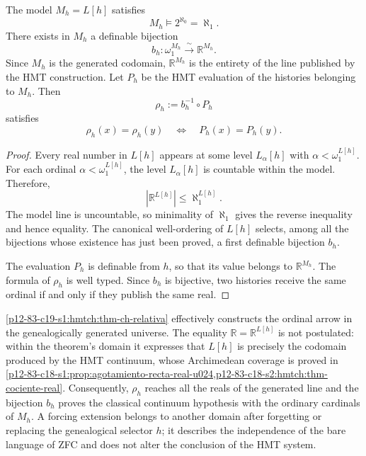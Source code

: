 \begin{theorem}
\label{p12-83-c19-s1:hmtch:thm-ch-relativa}
The model \(M_h=L[h]\) satisfies
\[
 M_h\models 2^{\aleph_0}=\aleph_1.
\]
There exists in \(M_h\) a definable bijection
\[
 b_h:\omega_1^{M_h}\xrightarrow{\ \sim\ }\mathbb R^{M_h}.
\]
Since \(M_h\) is the generated codomain, \(\mathbb R^{M_h}\) is the entirety of
the line published by the HMT construction. Let \(P_h\) be the HMT evaluation of
the histories belonging to \(M_h\). Then
\[
 \rho_h:=b_h^{-1}\circ P_h
\]
satisfies
\[
 \rho_h(x)=\rho_h(y)
 \quad\Longleftrightarrow\quad
 P_h(x)=P_h(y).
\]
\end{theorem}

\begin{proof}
Every real number in \(L[h]\) appears at some level
\(L_\alpha[h]\) with \(\alpha<\omega_1^{L[h]}\). For each ordinal
\(\alpha<\omega_1^{L[h]}\), the level \(L_\alpha[h]\) is countable within
the model. Therefore,
\[
 |\mathbb R^{L[h]}|\leq\aleph_1^{L[h]}.
\]
The model line is uncountable, so minimality of \(\aleph_1\)
gives the reverse inequality and hence equality. The canonical well-ordering
of \(L[h]\) selects, among all the bijections whose existence has just
been proved, a first definable bijection \(b_h\).

The evaluation \(P_h\) is definable from \(h\), so that its value
belongs to \(\mathbb R^{M_h}\). The formula of \(\rho_h\) is well typed.
Since \(b_h\) is bijective, two histories receive the same ordinal if and only
if they publish the same real.
\end{proof}

\begin{remark}
\label{p12-83-c19-s1:hmtch:rem-alcance-relativo}
\cref{p12-83-c19-s1:hmtch:thm-ch-relativa} effectively constructs the
ordinal arrow in the genealogically generated universe. The equality
\(\mathbb R=\mathbb R^{L[h]}\) is not postulated: within the theorem's domain
it expresses that \(L[h]\) is precisely the codomain produced by the HMT
continuum, whose Archimedean coverage is proved in
\cref{p12-83-c18-s1:prop:agotamiento-recta-real-u024,p12-83-c18-s2:hmtch:thm-cociente-real}.
Consequently, \(\rho_h\) reaches all the reals of the generated line and
the bijection \(b_h\) proves the classical continuum hypothesis with the
ordinary cardinals of \(M_h\). A forcing extension belongs to another
domain after forgetting or replacing the genealogical selector \(h\); it describes
the independence of the bare language of ZFC and does not alter the conclusion of the
HMT system.
\end{remark}

